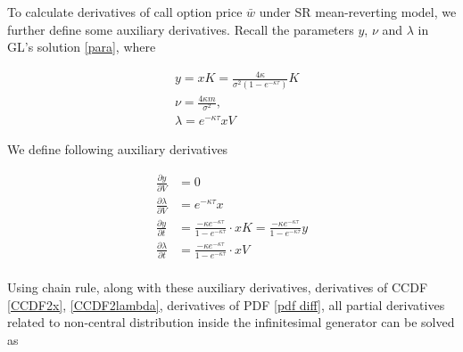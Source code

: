 To calculate derivatives of call option price $\bar{w}$ under SR mean-reverting model, we further define some auxiliary derivatives. Recall the parameters $y$, $\nu$ and $\lambda$ in GL's solution \eqref{para}, where

\begin{equation}
    \begin{aligned}
        &y = xK=\frac{4 \kappa}{\sigma^{2}(1-e^{-\kappa \tau})}K \\
        &\nu=\frac{4 \kappa m}{\sigma^{2}}, \\
        &\lambda= e^{-\kappa \tau}x V
    \end{aligned}
\end{equation}

\noindent We define following auxiliary derivatives

\begin{equation}\label{aux diff}
    \begin{aligned}
        \frac{\partial y}{\partial V} &= 0\\
        \frac{\partial \lambda}{\partial V}&= e^{-\kappa \tau}x \\
        \frac{\partial y}{\partial t} &= \frac{-\kappa e^{-\kappa \tau}}{1 - e^{-\kappa \tau}} \cdot xK=\frac{-\kappa e^{-\kappa \tau}}{1 - e^{-\kappa \tau}} y\\
        \frac{\partial \lambda}{\partial t}&= \frac{-\kappa e^{-\kappa \tau}}{1 - e^{-\kappa \tau}} \cdot  xV \\
    \end{aligned}
\end{equation}

Using chain rule, along with these auxiliary derivatives, derivatives of CCDF \eqref{CCDF2x}, \eqref{CCDF2lambda}, derivatives of PDF \eqref{pdf diff}, all partial derivatives related to non-central distribution inside the infinitesimal generator can be solved as

